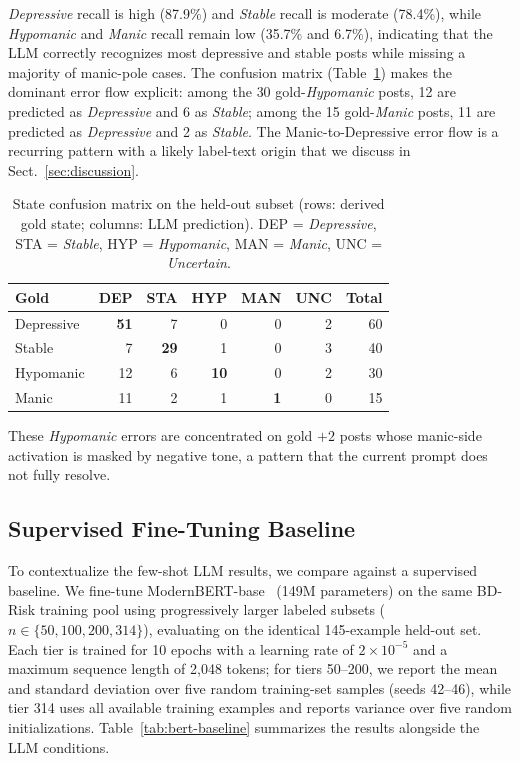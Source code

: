 \documentclass[runningheads]{llncs}
\begin{document}
\emph{Depressive} recall is high (87.9\%) and \emph{Stable} recall is moderate (78.4\%), while \emph{Hypomanic} and \emph{Manic} recall remain low (35.7\% and 6.7\%), indicating that the LLM correctly recognizes most depressive and stable posts while missing a majority of manic-pole cases. The confusion matrix (Table~\ref{tab:state-cm}) makes the dominant error flow explicit: among the 30 gold-\emph{Hypomanic} posts, 12 are predicted as \emph{Depressive} and 6 as \emph{Stable}; among the 15 gold-\emph{Manic} posts, 11 are predicted as \emph{Depressive} and 2 as \emph{Stable}. The Manic-to-Depressive error flow is a recurring pattern with a likely label-text origin that we discuss in Sect.~\ref{sec:discussion}.

\begin{table}[t]
\caption{State confusion matrix on the held-out subset (rows: derived gold state; columns: LLM prediction). DEP = \emph{Depressive}, STA = \emph{Stable}, HYP = \emph{Hypomanic}, MAN = \emph{Manic}, UNC = \emph{Uncertain}.}
\label{tab:state-cm}
\centering
\setlength{\tabcolsep}{8pt}
\begin{tabular}{lrrrrrr}
\toprule
\textbf{Gold} & \textbf{DEP} & \textbf{STA} & \textbf{HYP} & \textbf{MAN} & \textbf{UNC} & \textbf{Total} \\
\midrule
Depressive & \textbf{51} & 7 & 0 & 0 & 2 & 60 \\
Stable & 7 & \textbf{29} & 1 & 0 & 3 & 40 \\
Hypomanic & 12 & 6 & \textbf{10} & 0 & 2 & 30 \\
Manic & 11 & 2 & 1 & \textbf{1} & 0 & 15 \\
\bottomrule
\end{tabular}
\end{table}

These \emph{Hypomanic} errors are concentrated on gold $+2$ posts whose manic-side activation is masked by negative tone, a pattern that the current prompt does not fully resolve.

\subsection{Supervised Fine-Tuning Baseline}
\label{sec:bert}

To contextualize the few-shot LLM results, we compare against a supervised baseline. We fine-tune ModernBERT-base~\cite{warner2025modernbert} (149M parameters) on the same BD-Risk training pool using progressively larger labeled subsets ($n \in \{50, 100, 200, 314\}$), evaluating on the identical 145-example held-out set. Each tier is trained for 10 epochs with a learning rate of $2 \times 10^{-5}$ and a maximum sequence length of 2,048 tokens; for tiers 50--200, we report the mean and standard deviation over five random training-set samples (seeds 42--46), while tier 314 uses all available training examples and reports variance over five random initializations. Table~\ref{tab:bert-baseline} summarizes the results alongside the LLM conditions.
\end{document}
